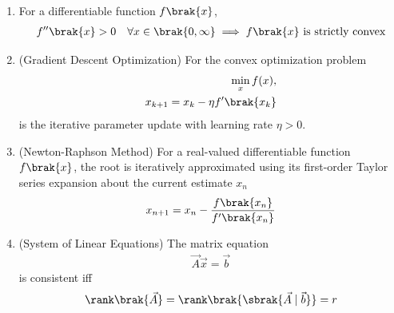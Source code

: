 \begin{enumerate}[label=\thesubsection.\arabic*, ref=\thesubsection.\theenumi,itemsep=0pt]
\item 
For a differentiable function $f\brak{x}$,
\begin{align}
f''\brak{x} > 0 \quad \forall x \in \brak{0, \infty} \implies f\brak{x} \text{ is strictly convex} \label{eq:EE26BTECH11213-convexity_check}
\end{align}
\item (Gradient Descent Optimization) For the convex optimization problem
\begin{align}
	\min_x f(x),
	\\
x_{k+1} = x_k - \eta f'\brak{x_k} \label{eq:EE26BTECH11213-grad_descent_update}
\end{align}
is the iterative parameter update with learning rate $\eta > 0$. 
\item (Newton-Raphson Method)
For a real-valued differentiable function $f\brak{x}$, the root is iteratively approximated using its first-order Taylor series expansion about the current estimate $x_n$
\begin{align}
x_{n+1} = x_n - \frac{f\brak{x_n}}{f'\brak{x_n}} \label{eq:EE26BTECH11213-newton_raphson}
\end{align}
\item (System of Linear Equations) 
The matrix equation
\begin{align}
\vec{A}\vec{x} = \vec{b} \label{eq:EE26BTECH11213-linear_sys}
\end{align}
    is consistent iff
    \begin{align}
    \rank\brak{\vec{A}} = \rank\brak{\sbrak{\vec{A} \mid \vec{b}}} = r \label{eq:EE26BTECH11213-consistent_rank}
    \end{align}

\end{enumerate}
